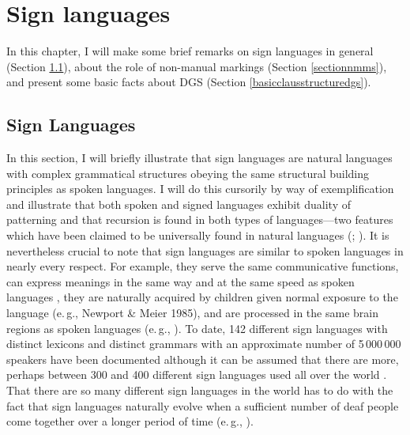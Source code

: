 \chapter{Sign languages}\label{chapterone}
In this chapter, I will make some brief remarks on sign languages in general (Section \ref{signlanguagesintro}), about the role of non-manual markings (Section \ref{sectionnmms}), and present some basic facts about DGS (Section \ref{basicclausstructuredgs}). 
%


\section{Sign Languages}\label{signlanguagesintro}
In this section, I will briefly illustrate that sign languages are natural languages with complex grammatical structures obeying the same structural building principles as spoken languages. I will do this cursorily by way of exemplification and illustrate that both spoken and signed languages exhibit duality of patterning and that recursion is found in both types of languages---two features which have been  claimed to be universally found in natural languages (\citealt{martinet1949double}; \citealt{hockett1960origin}). It is nevertheless crucial to note that sign languages are similar to spoken languages in nearly every respect. For example, they serve the same communicative functions, can express meanings in the same way and at the same speed as spoken languages \citep{bellugi1972comparison}, they are naturally acquired by children given normal exposure to the language (e.\,g., Newport \& Meier 1985), and are processed in the same brain regions as spoken languages (e.\,g., \citealt{emmorey2002language}). To date, 142 different sign languages with distinct lexicons and distinct grammars with an approximate number of 5\,000\,000 speakers have been documented \citep{simons2018ethnologue} although it can be assumed that there are more, perhaps between 300 and 400 different sign languages used all over the world \citep{zeshan2009sign}. That there are so many different sign languages in the world has to do with the fact that sign languages naturally evolve when a sufficient number of deaf people come together over a longer period of time (e.\,g., \citealt{kegletal1999creation}).

